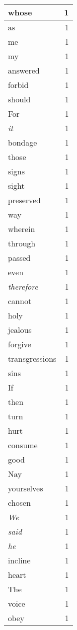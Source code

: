 \begin{center}
\begin{longtable}{l|r}
whose & 1\\ \hline 
as & 1\\ \hline 
me & 1\\ \hline 
my & 1\\ \hline 
answered & 1\\ \hline 
forbid & 1\\ \hline 
should & 1\\ \hline 
For & 1\\ \hline 
\emph{it} & 1\\ \hline 
bondage & 1\\ \hline 
those & 1\\ \hline 
signs & 1\\ \hline 
sight & 1\\ \hline 
preserved & 1\\ \hline 
way & 1\\ \hline 
wherein & 1\\ \hline 
through & 1\\ \hline 
passed & 1\\ \hline 
even & 1\\ \hline 
\emph{therefore} & 1\\ \hline 
cannot & 1\\ \hline 
holy & 1\\ \hline 
jealous & 1\\ \hline 
forgive & 1\\ \hline 
transgressions & 1\\ \hline 
sins & 1\\ \hline 
If & 1\\ \hline 
then & 1\\ \hline 
turn & 1\\ \hline 
hurt & 1\\ \hline 
consume & 1\\ \hline 
good & 1\\ \hline 
Nay & 1\\ \hline 
yourselves & 1\\ \hline 
chosen & 1\\ \hline 
\emph{We} & 1\\ \hline 
\emph{said} & 1\\ \hline 
\emph{he} & 1\\ \hline 
incline & 1\\ \hline 
heart & 1\\ \hline 
The & 1\\ \hline 
voice & 1\\ \hline 
obey & 1\\ \hline 

\end{longtable}
\end{center}
